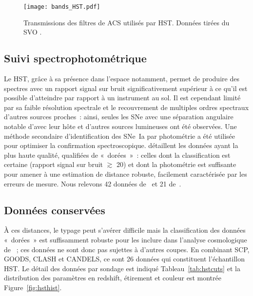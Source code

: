 \documentclass[../main/main.tex]{subfiles}
\begin{document}
\begin{figure}[!ht]
    \centering
    \texttt{[image: bands\_HST.pdf]}
    \caption[Transmissions des filtres de la caméra du sondage HST]
    {Transmissions des filtres de ACS utilisés par HST. Données tirées du SVO
    \citep{rodrigo2020}.}
    \label{fig:hstbands}
\end{figure}

\subsection{Suivi spectrophotométrique}\label{ssec:hstspectro}

Le HST, grâce à sa présence dans l'espace notamment, permet de produire des
spectres avec un rapport signal sur bruit significativement supérieur à ce qu'il
est possible d'atteindre par rapport à un instrument au sol. Il est cependant
limité par sa faible résolution spectrale et le recouvrement de multiples ordres
spectraux d'autres sources proches~: ainsi, seules les SNe avec une séparation
angulaire notable d'avec leur hôte et d'autres sources lumineuses ont été
observées. Une méthode secondaire d'identification des SNe~Ia par photométrie a
été utilisée pour optimiser la confirmation spectroscopique. \cite{riess2007}
détaillent les données ayant la plus haute qualité, qualifiées de «~dorées~»~:
celles dont la classification est certaine (rapport signal sur bruit $\gtrsim$
20) et dont la photométrie est suffisante pour amener à une estimation de
distance robuste, facilement caractérisée par les erreurs de mesure. Nous
relevons 42 données de~\cite{strolger2004} et 21 de~\cite{riess2007}.

\subsection{Données conservées}\label{ssec:hstdata}

À ces distances, le typage peut s'avérer difficile mais la classification des
données «~dorées~» est suffisamment robuste pour les inclure dans l'analyse
cosmologique de \citep{scolnic2018}~; ces données ne sont donc pas sujettes à
d'autres coupes. En combinant SCP, GOODS, CLASH et CANDELS, ce sont 26 données
qui constituent l'échantillon HST. Le détail des données par sondage est
indiqué Tableau~\ref{tab:hstcuts} et la distribution des paramètres en redshift,
étirement et couleur est montrée Figure~\ref{fig:hsthist}.
\end{document}
